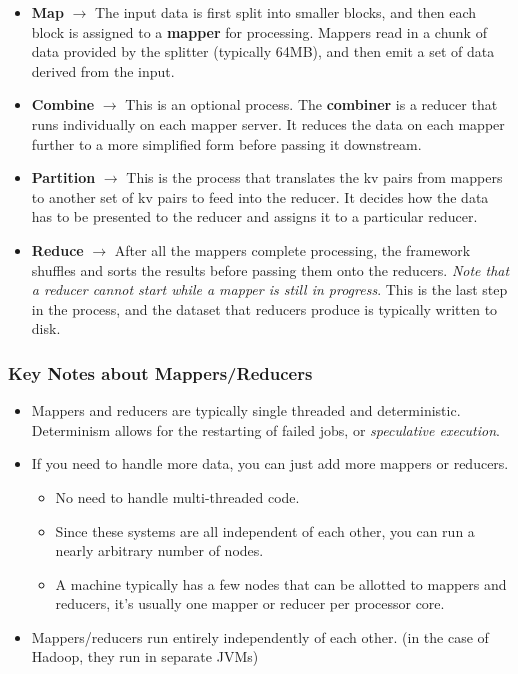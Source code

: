 \documentclass[english, 10pt]{article}
\begin{document}
\begin{itemize}
	\item \textbf{Map} $\rightarrow$ The input data is first split into smaller blocks, and then each block is assigned to a \textbf{mapper} for processing. Mappers read in a chunk of data provided by the splitter (typically 64MB), and then emit a set of data derived from the input.
	\item \textbf{Combine} $\rightarrow$ This is an optional process. The \textbf{combiner} is a reducer that runs individually on each mapper server. It reduces the data on each mapper further to a more simplified form before passing it downstream.
	\item \textbf{Partition} $\rightarrow$ This is the process that translates the kv pairs from mappers to another set of kv pairs to feed into the reducer. It decides how the data has to be presented to the reducer and assigns it to a particular reducer.
	\item \textbf{Reduce} $\rightarrow$ After all the mappers complete processing, the framework shuffles and sorts the results before passing them onto the reducers. \textit{Note that a reducer cannot start while a mapper is still in progress}. This is the last step in the process, and the dataset that reducers produce is typically written to disk.
\end{itemize}

\subsubsection{Key Notes about Mappers/Reducers}

\begin{itemize}
	\item Mappers and reducers are typically single threaded and deterministic. Determinism allows for the restarting of failed jobs, or \textit{speculative execution}.
	\item If you need to handle more data, you can just add more mappers or reducers.
	\begin{itemize}
		\item No need to handle multi-threaded code.
		\item Since these systems are all independent of each other, you can run a nearly arbitrary number of nodes.
		\item A machine typically has a few nodes that can be allotted to mappers and reducers, it's usually one mapper or reducer per processor core.
	\end{itemize}
	\item Mappers/reducers run entirely independently of each other. (in the case of Hadoop, they run in separate JVMs)
\end{itemize}
\end{document}
